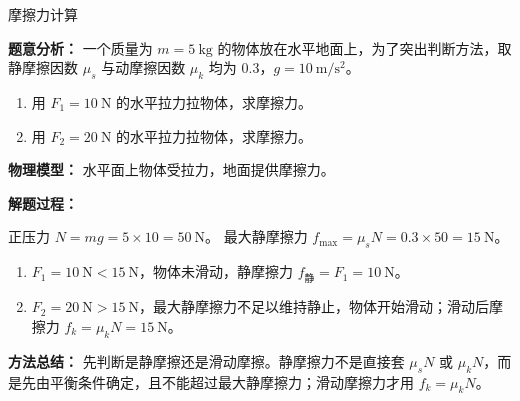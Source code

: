 \begin{examplebox}{摩擦力计算}

\textbf{题意分析：} 一个质量为 $m = 5\ \mathrm{kg}$ 的物体放在水平地面上，为了突出判断方法，取静摩擦因数 $\mu_s$ 与动摩擦因数 $\mu_k$ 均为 $0.3$，$g = 10\ \mathrm{m/s^2}$。
\begin{enumerate}
  \item 用 $F_1 = 10\ \mathrm{N}$ 的水平拉力拉物体，求摩擦力。
  \item 用 $F_2 = 20\ \mathrm{N}$ 的水平拉力拉物体，求摩擦力。
\end{enumerate}

\textbf{物理模型：} 水平面上物体受拉力，地面提供摩擦力。

\textbf{解题过程：}

正压力 $N = mg = 5 \times 10 = 50\ \mathrm{N}$。
最大静摩擦力 $f_{\max} = \mu_s N = 0.3 \times 50 = 15\ \mathrm{N}$。

\begin{enumerate}
  \item $F_1 = 10\ \mathrm{N} < 15\ \mathrm{N}$，物体未滑动，静摩擦力 $f_{\text{静}} = F_1 = 10\ \mathrm{N}$。
  \item $F_2 = 20\ \mathrm{N} > 15\ \mathrm{N}$，最大静摩擦力不足以维持静止，物体开始滑动；滑动后摩擦力 $f_k = \mu_k N = 15\ \mathrm{N}$。
\end{enumerate}

\textbf{方法总结：} 先判断是静摩擦还是滑动摩擦。静摩擦力不是直接套 $\mu_s N$ 或 $\mu_k N$，而是先由平衡条件确定，且不能超过最大静摩擦力；滑动摩擦力才用 $f_k=\mu_k N$。

\end{examplebox}

